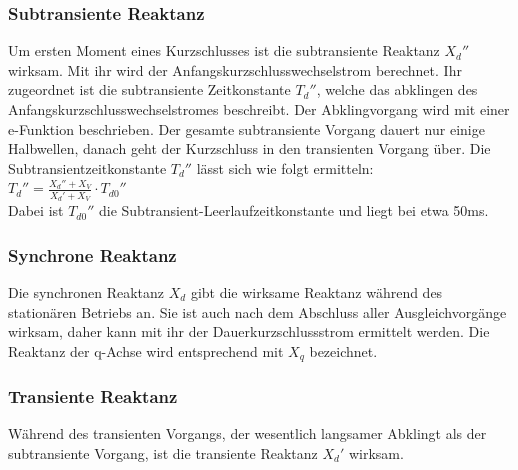 \documentclass{scrartcl}
\begin{document}
\begin{onehalfspace}


\subsubsection{Subtransiente Reaktanz}
Um ersten Moment eines Kurzschlusses ist die subtransiente Reaktanz $X_d''$ wirksam. Mit ihr wird der Anfangskurzschlusswechselstrom berechnet. Ihr zugeordnet ist die subtransiente Zeitkonstante $T_d''$, welche das abklingen des Anfangskurzschlusswechselstromes beschreibt. Der Abklingvorgang wird mit einer e-Funktion beschrieben. Der gesamte subtransiente Vorgang dauert nur einige Halbwellen, danach geht der Kurzschluss in den transienten Vorgang über. Die Subtransientzeitkonstante $T_d''$ lässt sich wie folgt ermitteln: \\

$T_d'' = \frac{X_d'' + X_V}{X_d' + X_V} \cdot T_{d0}''$ \\

Dabei ist $T_{d0}''$ die Subtransient-Leerlaufzeitkonstante und liegt bei etwa 50ms.



\subsubsection{Synchrone Reaktanz}
Die synchronen Reaktanz $X_d$ gibt die wirksame Reaktanz während des stationären Betriebs an. Sie ist auch nach dem Abschluss aller Ausgleichvorgänge wirksam, daher kann mit ihr der Dauerkurzschlussstrom ermittelt werden. Die Reaktanz der q-Achse wird entsprechend mit $X_q$ bezeichnet.

\subsubsection{Transiente Reaktanz}
Während des transienten Vorgangs, der wesentlich langsamer Abklingt als der subtransiente Vorgang, ist die transiente Reaktanz $X_d'$ wirksam.


\end{onehalfspace}
\end{document}
